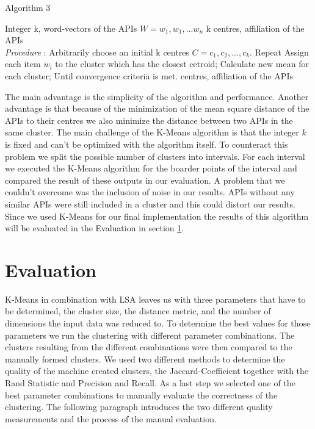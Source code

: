 \documentclass[a4paper]{IEEEtran}
\begin{document}
\begin{algorithm}[H]
 \caption{Algorithm 3}
 \begin{algorithmic}[1]
\renewcommand{\algorithmicrequire}{\textbf{Input:}}
 \renewcommand{\algorithmicensure}{\textbf{Output:}}
 \REQUIRE Integer k, \newline word-vectors of the APIs $W={w_1, w_1, ... w_n}$
 \ENSURE  k centres, affiliation of the APIs
 \\ \textit{Procedure} :
  \STATE Arbitrarily choose an initial k centres $C = {c_1, c_2, ..., c_k}$.
 \STATE Repeat \newline
\noindent\hspace*{5mm}%
			Assign each item $w_i$ to the cluster which has \newline 
\noindent\hspace*{5mm}%
			the closest cetroid;\newline
\noindent\hspace*{5mm}%
			Calculate new mean for each cluster;\newline
	Until convergence criteria is met.
\RETURN centres, affiliation of the APIs
 \end{algorithmic}
 \end{algorithm}



The main advantage is the simplicity of the algorithm and performance. Another advantage is that because of the minimization of the mean square distance of the APIs to their centres we also minimize the distance between two APIs in the same cluster.
The main challenge of the K-Means algorithm is that the integer $k$ is fixed and can’t be optimized with the algorithm itself. To counteract this problem we split the possible number of clusters into intervals. For each interval we executed the K-Means algorithm for the boarder points of the interval and compared the result of these outputs in our evaluation.
A problem that we couldn’t overcome was the inclusion of noise in our results. APIs without any similar APIs were still included in a cluster and this could distort our results.
Since we used K-Means for our final implementation the results of this algorithm will be evaluated in the Evaluation in section \ref{sec:eval}.


\section{Evaluation}
\label{sec:eval}
K-Means in combination with LSA leaves us with three parameters that have to be determined, the cluster size, the distance metric, and the number of dimensions the input data was reduced to. To determine the best values for those parameters we run the clustering with different parameter combinations. The clusters resulting from the different combinations were then compared to the manually formed clusters. We used two different methods to determine the quality of the machine created clusters, the Jaccard-Coefficient together with the Rand Statistic and Precision and Recall. As a last step we selected one of the best parameter combinations to manually evaluate the correctness of the clustering. The following paragraph introduces the two different quality measurements and the process of the manual evaluation.
\end{document}
